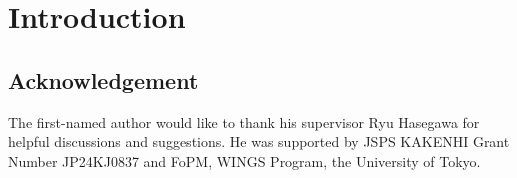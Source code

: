 \documentclass{amsart}
\title{}
\author{Ryuya Hora}
\date{\today}
\theoremstyle{plain}
\theoremstyle{definition}
\theoremstyle{remark}
\begin{document}
\begin{abstract}

\end{abstract}
\maketitle

\tableofcontents

\section{Introduction}

\cite{johnstone2014topos}

\subsection*{Acknowledgement}

The first-named author would like to thank his supervisor Ryu Hasegawa for helpful discussions and suggestions. 
He was supported by JSPS KAKENHI Grant Number JP24KJ0837 and FoPM, WINGS Program, the University of Tokyo.


\printbibliography
\end{document}
